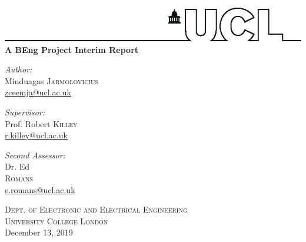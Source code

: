 \documentclass[a4paper,12pt]{article}
\begin{document}
	\begin{titlepage}
		\includegraphics[width=\linewidth]{graphics/ucl-banner-dl-port-outline.eps}\\[1cm]
		\center
		{ \huge \bfseries A BEng Project Interim Report}\\[1cm]

		
		\begin{multicols}{3}
			
		\Large \emph{Author:}\\
		Minduagas \textsc{Jarmolovicius}\\
		\href{mailto:zceemja@ucl.ac.uk}{zceemja@ucl.ac.uk}\\
		
		\columnbreak
		
		\Large \emph{Supervisor:}\\
		Prof. Robert \textsc{Killey}\\
		\href{mailto:r.killey@ucl.ac.uk}{r.killey@ucl.ac.uk}
		
		\columnbreak
		
		\Large \emph{Second Assessor:}\\
		Dr. Ed \\\textsc{Romans}\\
		\href{mailto:e.romans@ucl.ac.uk}{e.romans@ucl.ac.uk}
		
		\end{multicols}

		\textsc{\large Dept. of Electronic and Electrical Engineering}\\
		\textsc{\Large University College London}\\
		
		\vfill
		{\large December 13, 2019}\\[2cm]
		
	\end{titlepage}
\pagebreak
\end{document}
